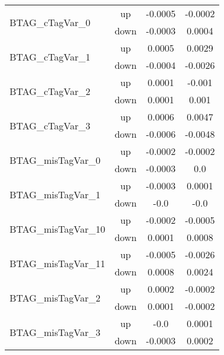 \begin{table}[h!]
\begin{tabular}{lccc}
\multirow{2}{*}{BTAG\_cTagVar\_0}      & up   &     -0.0005         &     -0.0002      \\
                                       & down &     -0.0003         &     0.0004       \\ \hline
\multirow{2}{*}{BTAG\_cTagVar\_1}      & up   &     0.0005          &     0.0029      \\
                                       & down &     -0.0004         &     -0.0026       \\ \hline
\multirow{2}{*}{BTAG\_cTagVar\_2}      & up   &     0.0001        &     -0.001      \\
                                       & down &     0.0001         &     0.001       \\ \hline
\multirow{2}{*}{BTAG\_cTagVar\_3}      & up   &     0.0006          &     0.0047      \\
                                       & down &     -0.0006          &     -0.0048       \\ \hline
\multirow{2}{*}{BTAG\_misTagVar\_0}      & up   &     -0.0002         &     -0.0002      \\
                                       & down &     -0.0003          &     0.0       \\ \hline
\multirow{2}{*}{BTAG\_misTagVar\_1}      & up   &     -0.0003        &     0.0001      \\
                                       & down &     -0.0        &     -0.0       \\ \hline
\multirow{2}{*}{BTAG\_misTagVar\_10}      & up   &     -0.0002      &     -0.0005      \\
                                       & down &     0.0001          &     0.0008       \\ \hline
\multirow{2}{*}{BTAG\_misTagVar\_11}      & up   &     -0.0005      &     -0.0026      \\
                                       & down &     0.0008         &     0.0024       \\ \hline
\multirow{2}{*}{BTAG\_misTagVar\_2}      & up   &     0.0002       &     -0.0002      \\
                                       & down &     0.0001         &     -0.0002       \\ \hline
\multirow{2}{*}{BTAG\_misTagVar\_3}      & up   &     -0.0        &     0.0001      \\
                                       & down &     -0.0003         &     0.0002       \\ \hline

\end{tabular}
\end{table}
